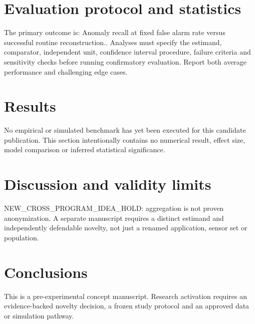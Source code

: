 \documentclass[11pt,a4paper]{article}
\begin{document}
\section{Evaluation protocol and statistics}
The primary outcome is: Anomaly recall at fixed false alarm rate versus successful routine reconstruction.. Analyses must specify the estimand, comparator, independent unit, confidence interval procedure, failure criteria and sensitivity checks before running confirmatory evaluation. Report both average performance and challenging edge cases.
\section{Results}
No empirical or simulated benchmark has yet been executed for this candidate publication. This section intentionally contains no numerical result, effect size, model comparison or inferred statistical significance.
\section{Discussion and validity limits}
NEW\_CROSS\_PROGRAM\_IDEA\_HOLD: aggregation is not proven anonymization. A separate manuscript requires a distinct estimand and independently defendable novelty, not just a renamed application, sensor set or population.
\section{Conclusions}
This is a pre-experimental concept manuscript. Research activation requires an evidence-backed novelty decision, a frozen study protocol and an approved data or simulation pathway.
\end{document}
